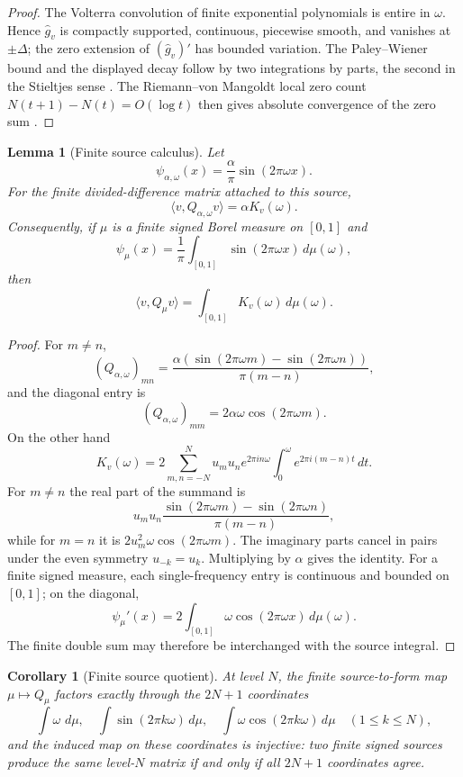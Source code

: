 \documentclass[11pt]{article}
\theoremstyle{plain}
\newtheorem{lemma}[theorem]{Lemma}
\newtheorem{corollary}[theorem]{Corollary}
\theoremstyle{definition}
\theoremstyle{remark}
\newcommand{\wh}{\widehat}
\newcommand{\dd}{\,d}
\begin{document}
\begin{proof}
The Volterra convolution of finite exponential polynomials is entire in
$\omega$.  Hence $\wh g_v$ is compactly supported, continuous, piecewise
smooth, and vanishes at $\pm\Delta$; the zero extension of $(\wh g_v)'$ has
bounded variation.  The Paley--Wiener bound and the displayed decay follow by
two integrations by parts, the second in the Stieltjes sense
\cite{Rudin1987,Katznelson2004}.  The Riemann--von Mangoldt local zero count
$N(t+1)-N(t)=O(\log t)$ then gives absolute convergence of the zero sum
\cite[Ch.~9]{Titchmarsh1986}.
\end{proof}

\begin{lemma}[Finite source calculus]\label{lem:source-calculus}
Let
\[
        \psi_{\alpha,\omega}(x)=\frac{\alpha}{\pi}\sin(2\pi\omega x).
\]
For the finite divided-difference matrix attached to this source,
\[
        \langle v,Q_{\alpha,\omega}v\rangle=\alpha K_v(\omega).
\]
Consequently, if $\mu$ is a finite signed Borel measure on $[0,1]$ and
\[
        \psi_\mu(x)=\frac1\pi\int_{[0,1]}\sin(2\pi\omega x)\dd\mu(\omega),
\]
then
\[
        \langle v,Q_\mu v\rangle
        =\int_{[0,1]}K_v(\omega)\dd\mu(\omega).
\]
\end{lemma}

\begin{proof}
For $m\ne n$,
\[
 (Q_{\alpha,\omega})_{mn}=
 \frac{\alpha(\sin(2\pi\omega m)-\sin(2\pi\omega n))}
      {\pi(m-n)},
\]
and the diagonal entry is
\[
        (Q_{\alpha,\omega})_{mm}=2\alpha\omega\cos(2\pi\omega m).
\]
On the other hand
\[
K_v(\omega)=
2\sum_{m,n=-N}^{N}u_m u_n e^{2\pi i n\omega}
 \int_0^\omega e^{2\pi i(m-n)t}\dd t .
\]
For $m\ne n$ the real part of the summand is
\[
u_m u_n
\frac{\sin(2\pi\omega m)-\sin(2\pi\omega n)}
     {\pi(m-n)},
\]
while for $m=n$ it is $2u_m^2\omega\cos(2\pi\omega m)$.  The imaginary parts
cancel in pairs under the even symmetry $u_{-k}=u_k$.  Multiplying by $\alpha$
gives the identity.  For a finite signed measure, each single-frequency entry
is continuous and bounded on $[0,1]$; on the diagonal,
\[
        \psi_\mu'(x)=2\int_{[0,1]}\omega\cos(2\pi\omega x)\dd\mu(\omega).
\]
The finite double sum may therefore be interchanged with the source integral.
\end{proof}

\begin{corollary}[Finite source quotient]\label{cor:source-quotient}
At level $N$, the finite source-to-form map $\mu\mapsto Q_\mu$ factors exactly
through the $2N+1$ coordinates
\[
        \int\omega\,\dd\mu,\quad
        \int\sin(2\pi k\omega)\dd\mu,\quad
        \int\omega\cos(2\pi k\omega)\dd\mu
        \quad(1\le k\le N),
\]
and the induced map on these coordinates is injective: two finite signed
sources produce the same level-$N$ matrix if and only if all $2N+1$
coordinates agree.
\end{corollary}
\end{document}
